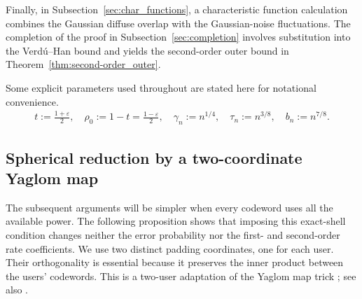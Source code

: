 \documentclass[11pt,onecolumn]{IEEEtran}
\newcommand{\eps}{\varepsilon}
\begin{document}
Finally, in Subsection~\ref{sec:char_functions},  a characteristic function
calculation combines the Gaussian diffuse overlap with the Gaussian-noise
fluctuations. The completion of the proof in Subsection~\ref{sec:completion} involves substitution into the Verd\'u--Han bound and yields the
second-order outer bound in
Theorem~\ref{thm:second-order_outer}.

Some explicit parameters used throughout are stated here for notational convenience. 
\begin{align}
t:=\frac{1+\eps}{2},\quad \rho_0:=1-t=\frac{1-\eps}{2},\quad \gamma_n:=n^{1/4},\quad \tau_n:=n^{3/8},\quad b_n :=n^{7/8}. \label{eqn:params2}
\end{align}

\subsection{Spherical reduction by a two-coordinate Yaglom map} \label{sec:yaglom}
The subsequent arguments will be simpler when every codeword uses all the
available power. The following proposition shows that imposing this
exact-shell condition changes neither the error probability nor the
first- and second-order rate coefficients. We use two distinct padding
coordinates, one for each user. Their orthogonality is essential because
it preserves the inner product between the users' codewords.
This is a two-user adaptation of the  Yaglom map trick \cite[Sec.~2]{SoleBelfiore2013}; see also
\cite[Ch.~9, Thm.~6]{ConwaySloane1999}.
\end{document}

